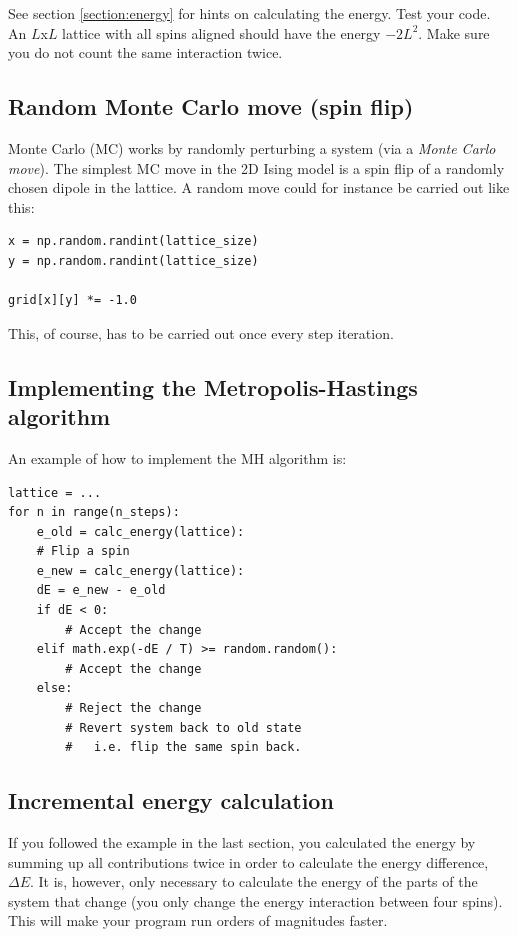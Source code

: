 \documentclass{article}
\begin{document}
See section \ref{section:energy} for hints on calculating the energy.
Test your code.
An $L$x$L$ lattice with all spins aligned should have the energy $-2L^2$.
Make sure you do not count the same interaction twice.\\

\subsection{Random Monte Carlo move (spin flip)}

Monte Carlo (MC) works by randomly perturbing a system (via a \textit{Monte Carlo move}).
The simplest MC move in the 2D Ising model is a spin flip of a randomly chosen dipole in the lattice.
A random move could for instance be carried out like this:

\begin{lstlisting}
x = np.random.randint(lattice_size)
y = np.random.randint(lattice_size)

grid[x][y] *= -1.0
\end{lstlisting}

This, of course, has to be carried out once every step iteration.

\subsection{Implementing the Metropolis-Hastings algorithm}

An example of how to implement the MH algorithm is: 

\begin{lstlisting}
lattice = ...
for n in range(n_steps):
    e_old = calc_energy(lattice):
    # Flip a spin
    e_new = calc_energy(lattice):
    dE = e_new - e_old
    if dE < 0:
        # Accept the change
    elif math.exp(-dE / T) >= random.random():
        # Accept the change
    else:
        # Reject the change
        # Revert system back to old state
        #   i.e. flip the same spin back.
\end{lstlisting}

\subsection{Incremental energy calculation}

If you followed the example in the last section, you calculated the energy by summing up all contributions twice in order to calculate the energy difference, $\Delta E$.
It is, however, only necessary to calculate the energy of the parts of the system that change (you only change the energy interaction between four spins).
This will make your program run orders of magnitudes faster.\\
\end{document}
